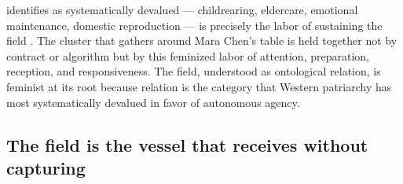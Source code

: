 identifies as systematically devalued — childrearing, eldercare, emotional maintenance, domestic reproduction — is precisely the labor of sustaining the field \cite{federici_2004}. The cluster that gathers around Mara Chen’s table is held together not by contract or algorithm but by this feminized labor of attention, preparation, reception, and responsiveness. The field, understood as ontological relation, is feminist at its root because relation is the category that Western patriarchy has most systematically devalued in favor of autonomous agency.

\subsection{The field is the vessel that receives without capturing}

